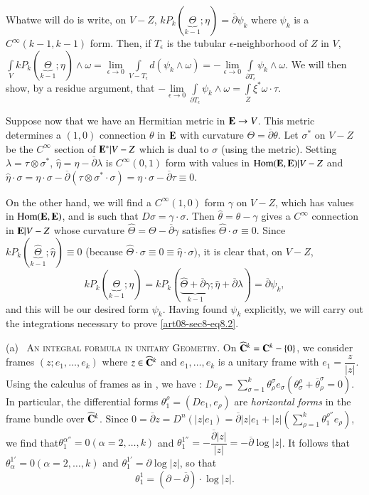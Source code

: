 What\pageoriginale we will do is write, on $V-Z$, $kP_{k}(\underbrace{\Theta}_{k-1};\eta)=\overline{\partial}\psi_{k}$ where $\psi_{k}$ is a $C^{\infty}(k-1,k-1)$ form. Then, if $T_{\epsilon}$ is the tubular $\epsilon$-neighborhood of $Z$ in $V$, $\int\limits_{V}kP_{k}(\underbrace{\Theta}_{k-1};\eta)\wedge\omega=\lim\limits_{\epsilon\to 0}\int\limits_{V-T_{\epsilon}}d(\psi_{k}\wedge\omega)=-\lim\limits_{\epsilon\to 0}\int\limits_{\partial T_{\epsilon}}\psi_{k}\wedge \omega$. We will then show, by a residue argument, that $-\lim\limits_{\epsilon\to 0}\int\limits_{\partial T_{\epsilon}}\psi_{k}\wedge\omega=\int\limits_{Z}\xi^{*}\omega\cdot \tau$.

Suppose now that we have an Hermitian metric in $\mathbf{E}\to V$. This metric determines a $(1,0)$ connection $\theta$ in $\mathbf{E}$ with curvature $\Theta=\overline{\partial}\theta$. Let $\sigma^{*}$ on $V-Z$ be the $C^{\infty}$ section of $\mathbf{E}^{*}|V-Z$ which is dual to $\sigma$ (using the metric). Setting $\lambda=\tau\otimes \sigma^{*}$, $\widehat{\eta}=\eta-\overline{\partial}\lambda$ is $C^{\infty}(0,1)$ form with values in $\operatorname{\mathrm{Hom}}(\mathbf{E},\mathbf{E})|V-Z$ and $\widehat{\eta}\cdot \sigma=\eta\cdot \sigma-\overline{\partial}(\tau\otimes \sigma^{*}\cdot \sigma)=\eta\cdot \sigma-\overline{\partial}\tau\equiv 0$.

On the other hand, we will find a $C^{\infty}(1,0)$ form $\gamma$ on $V-Z$, which has values in $\operatorname{\mathrm{Hom}}(\mathbf{E},\mathbf{E})$, and is such that $D\sigma=\gamma\cdot \sigma$. Then $\widehat{\theta}=\theta-\gamma$ gives a $C^{\infty}$ connection in $\mathbf{E}|V-Z$ whose curvature $\widehat{\Theta}=\Theta-\overline{\partial}\gamma$ satisfies $\widehat{\Theta}\cdot \sigma\equiv 0$. Since $kP_{k}(\underbrace{\widehat{\Theta}}_{k-1};\widehat{\eta})\equiv 0$ (because $\widehat{\Theta}\cdot \sigma\equiv 0\equiv \widehat{\eta}\cdot \sigma)$, it is clear that, on $V-Z$,
$$
kP_{k}(\underbrace{\Theta}_{k-1};\eta)=kP_{k}(\underbrace{\widehat{\Theta}+\overline{\partial}\gamma}_{k-1};\widehat{\eta}+\overline{\partial}\lambda)=\overline{\partial}\psi_{k},
$$
and this will be our desired form $\psi_{k}$. Having found $\psi_{k}$ explicitly, we will carry out the integrations necessary to prove \eqref{art08-sec8-eq8.2}.

(a)~ \textsc{An integral formula in unitary Geometry.} On $\widehat{\mathbf{C}}^{k}=\mathbf{C}^{k}-\{0\}$, we consider frames $(z;e_{1},\ldots,e_{k})$ where $z\in \widehat{\mathbf{C}}^{k}$ and $e_{1},\ldots,e_{k}$ is a unitary frame with $e_{1}=\dfrac{z}{|z|}$. Using the calculus of frames as in \cite{art08-key5}, we have : $De_{\rho}=\sum\limits^{k}_{\sigma=1}\theta^{\sigma}_{\rho}e_{\sigma}(\theta^{\rho}_{\sigma}+\overline{\theta}^{\sigma}_{\rho}=0)$. In particular, the differential forms $\theta^{\rho}_{1}=(De_{1},e_{\rho})$ are {\em horizontal forms} in the frame bundle over $\widehat{\mathbf{C}}^{k}$. Since $0=\overline{\partial}z=D^{n}(|z|e_{1})=\overline{\partial}|z|e_{1}+|z|\left(\sum\limits^{k}_{\rho=1}\theta^{\rho''}_{1}e_{\rho}\right)$, we find that\pageoriginale $\theta^{\alpha''}_{1}=0(\alpha=2,\ldots,k)$ and $\theta^{1''}_{1}=-\dfrac{\overline{\partial}|z|}{|z|}=-\overline{\partial}\log |z|$. It follows that $\theta^{1'}_{\alpha}=0(\alpha=2,\ldots,k)$ and $\theta^{1'}_{1}=\partial \log |z|$, so that
$$
\theta^{1}_{1}=(\partial-\overline{\partial})\cdot \log |z|.
$$


